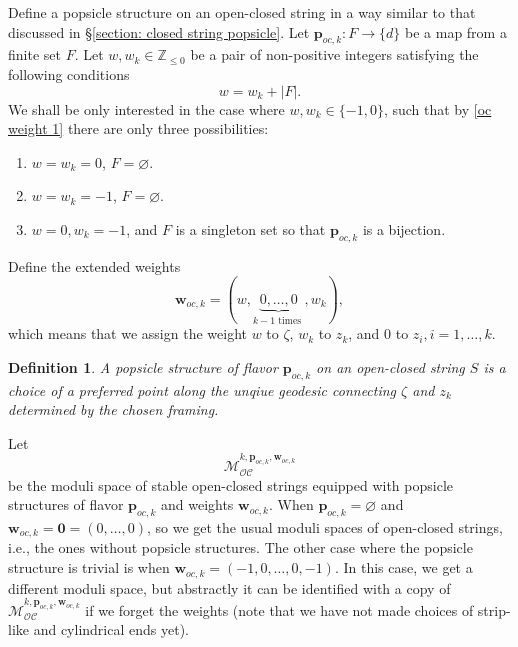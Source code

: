 \documentclass[11pt]{amsproc}
\def\Z{{\mathbb Z}}
\def\oc{\mathcal{OC}}
\def\M{\mathcal{M}}
\newtheorem{defn}[lem]{Definition}
\theoremstyle{remark}
\numberwithin{equation}{section}
\begin{document}
Define a popsicle structure on an open-closed string in a way similar to that discussed in \S\ref{section: closed string popsicle}.
Let $\mathbf{p}_{oc, k}: F \to \{d\}$ be a map from a finite set $F$.
Let $w, w_{k} \in \Z_{\le 0}$ be a pair of non-positive integers satisfying the following conditions
\begin{equation}\label{oc weight 1}
w = w_{k} + |F|.
\end{equation}
We shall be only interested in the case where $w, w_{k} \in \{-1, 0\}$,
such that by \eqref{oc weight 1} there are only three possibilities:
\begin{enumerate}[label=(\roman*)]

\item $w=w_{k}=0$, $F = \varnothing$.

\item $w=w_{k}=-1$, $F=\varnothing$.

\item $w=0, w_{k}=-1$, and $F$ is a singleton set so that $\mathbf{p}_{oc, k}$ is a bijection.

\end{enumerate}
Define the extended weights
\begin{equation}\label{extended weight}
\mathbf{w}_{oc, k} = (w, \underbrace{0, \ldots, 0}_{k-1 \text{ times }}, w_{k}),
\end{equation} 
which means that we assign the weight $w$ to $\zeta$, $w_{k}$ to $z_{k}$, and $0$ to $z_{i}, i=1, \ldots, k$.

\begin{defn}\label{def: popsicle on open-closed string}
A popsicle structure of flavor $\mathbf{p}_{oc, k}$ on an open-closed string $S$ is a choice of a preferred point along the unqiue geodesic connecting $\zeta$ and $z_{k}$ determined by the chosen framing.
\end{defn}

Let 
\begin{equation}
\M_{\oc}^{k, \mathbf{p}_{oc, k}, \mathbf{w}_{oc, k}}
\end{equation}
be the moduli space of stable open-closed strings equipped with popsicle structures of flavor $\mathbf{p}_{oc, k}$ and weights $\mathbf{w}_{oc, k}$.
When $\mathbf{p}_{oc, k} = \varnothing$ and $\mathbf{w}_{oc, k} = \mathbf{0} = (0, \ldots, 0)$,
so we get the usual moduli spaces of open-closed strings, i.e., the ones without popsicle structures.
The other case where the popsicle structure is trivial is when $\mathbf{w}_{oc, k} = (-1, 0, \ldots, 0, -1)$.
In this case, we get a different moduli space, 
but abstractly it can be identified with a copy of $\M_{\oc}^{k, \mathbf{p}_{oc, k}, \mathbf{w}_{oc, k}}$ if we forget the weights (note that we have not made choices of strip-like and cylindrical ends yet).
\end{document}
